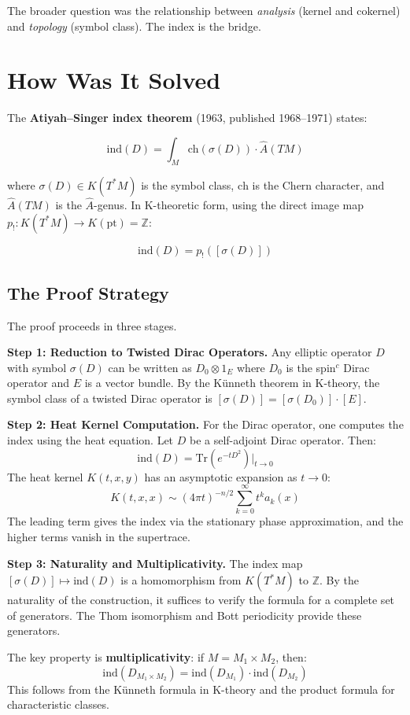 The broader question was the relationship between \emph{analysis} (kernel and
cokernel) and \emph{topology} (symbol class). The index is the bridge.

\section{How Was It Solved}

The \textbf{Atiyah--Singer index theorem} (1963, published 1968--1971) states:

\[\text{ind}(D) = \int_M \text{ch}(\sigma(D)) \cdot \widehat{A}(TM)\]

where $\sigma(D) \in K(T^*M)$ is the symbol class, $\text{ch}$ is the Chern
character, and $\widehat{A}(TM)$ is the $\widehat{A}$-genus. In K-theoretic
form, using the direct image map $p_!: K(T^*M) \to K(\text{pt}) = \mathbb{Z}$:

\[\text{ind}(D) = p_!([\sigma(D)])\]

\subsection*{The Proof Strategy}

The proof proceeds in three stages.

\textbf{Step 1: Reduction to Twisted Dirac Operators.}
Any elliptic operator $D$ with symbol $\sigma(D)$ can be written as
$D_0 \otimes 1_E$ where $D_0$ is the spin$^c$ Dirac operator and $E$ is a
vector bundle. By the Künneth theorem in K-theory, the symbol class of a
twisted Dirac operator is $[\sigma(D)] = [\sigma(D_0)] \cdot [E]$.

\textbf{Step 2: Heat Kernel Computation.}
For the Dirac operator, one computes the index using the heat equation.
Let $D$ be a self-adjoint Dirac operator. Then:
\[\text{ind}(D) = \text{Tr}(e^{-tD^2})|_{t \to 0}\]
The heat kernel $K(t, x, y)$ has an asymptotic expansion as $t \to 0$:
\[K(t, x, x) \sim (4\pi t)^{-n/2} \sum_{k=0}^\infty t^k a_k(x)\]
The leading term gives the index via the stationary phase approximation, and
the higher terms vanish in the supertrace.

\textbf{Step 3: Naturality and Multiplicativity.}
The index map $[\sigma(D)] \mapsto \text{ind}(D)$ is a homomorphism from
$K(T^*M)$ to $\mathbb{Z}$. By the naturality of the construction, it suffices
to verify the formula for a complete set of generators. The Thom isomorphism
and Bott periodicity provide these generators.

The key property is \textbf{multiplicativity}: if $M = M_1 \times M_2$, then:
\[\text{ind}(D_{M_1 \times M_2}) = \text{ind}(D_{M_1}) \cdot \text{ind}(D_{M_2})\]
This follows from the Künneth formula in K-theory and the product formula
for characteristic classes.

